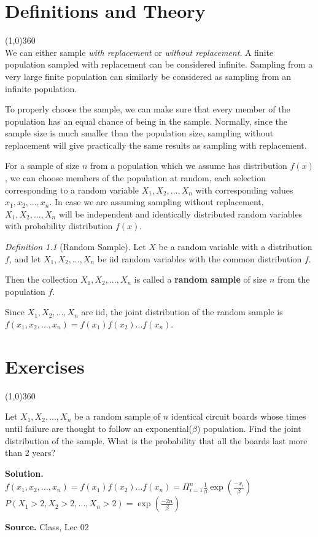 \documentclass[12pt,twoside]{report}
\theoremstyle{remark}
\newtheorem{defn}{Definition}
\newenvironment*{sol}{\textbf{Solution.}\space\em\\}{\par}
\newenvironment*{source}{\hfill\scriptsize\textbf{Source.}\space}{\par}
\begin{document}
\tableofcontents
\newpage
{}

\chapter{Definitions and Theory}
\line(1,0){360} \\

We can either sample \textit{with replacement} or \textit{without replacement}. A finite population sampled with replacement can be considered infinite. Sampling from a very large finite population can similarly be considered as sampling from an infinite population. 

To properly choose the sample, we can make sure that every member of the population has an equal chance of being in the sample.
Normally, since the sample size is much smaller than the population size, sampling without replacement will give practically the same results as sampling with replacement.

For a sample of size $n$ from a population which we assume has distribution $f(x)$, we can choose members of the population at random, each selection corresponding to a random variable $X_1, X_2, ..., X_n$ with corresponding values $x_1, x_2, ..., x_n$. In case we are assuming sampling without replacement, $X_1, X_2, ..., X_n$ will be independent and identically distributed random variables with probability distribution $f(x)$.

\begin{defn}[Random Sample]
Let $X$ be a random variable with a distribution $f$, and let $X_1, X_2, ..., X_n$ be iid random variables with the common distribution $f$.

Then the collection $X_1, X_2, ..., X_n$ is called a \textbf{random sample} of size $n$ from the population $f$.
\end{defn}

Since $X_1, X_2, ..., X_n$ are iid, the joint distribution of the random sample is $f(x_1, x_2, ..., x_n) = f(x_1) f(x_2) ... f(x_n)$.




\newpage
\chapter{Exercises}
\line(1,0){360} \\


\begin{ex}
Let $X_1, X_2, ..., X_n$ be a random sample of $n$ identical circuit boards whose times until failure are thought to follow an exponential($\beta$) population. Find the joint distribution of the sample. What is the probability that all the boards last more than 2 years?
\end{ex}
\begin{sol}
$f(x_1, x_2, ..., x_n)  = f(x_1) f(x_2) ... f(x_n) = \Pi_{i=1}^n \frac{1}{\beta} \exp(\frac{-x_i}{\beta})$ \\
$P(X_1 > 2, X_2 > 2, ..., X_n > 2) = \exp(\frac{-2n}{\beta})$
\end{sol}
\begin{source}
    Class, Lec 02
\end{source}
\end{document}
